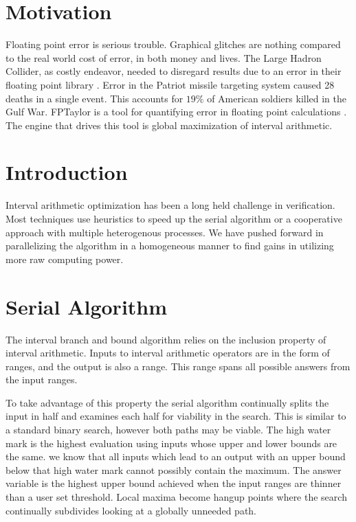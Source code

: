 \documentclass{acm_proc_article-sp}
\begin{document}
\maketitle

\section{Motivation}
Floating point error is serious trouble. Graphical glitches are nothing compared to the real world cost of error, in both money and lives. The Large Hadron Collider, as costly endeavor, needed to disregard results due to an error in their floating point library \cite{bailey2013high}. Error in the Patriot missile targeting system caused 28 deaths in a single event. This accounts for $19\%$ of American soldiers killed in the Gulf War\cite{blair1992patriot}. FPTaylor is a tool for quantifying error in floating point calculations \cite{fm2015-sjrg}. The engine that drives this tool is global maximization of interval arithmetic.

\section{Introduction}
Interval arithmetic optimization has been a long held challenge in verification. Most techniques use heuristics to speed up the serial algorithm or a cooperative approach with multiple heterogenous processes\cite{alliot2012finding}. We have pushed forward in parallelizing the algorithm in a homogeneous manner to find gains in utilizing more raw computing power.

\section{Serial Algorithm}
The interval branch and bound algorithm relies on the inclusion property of interval arithmetic. Inputs to interval arithmetic operators are in the form of ranges, and the output is also a range. This range spans all possible answers from the input ranges.

To take advantage of this property the serial algorithm continually splits the input in half and examines each half for viability in the search. This is similar to a standard binary search, however both paths may be viable. The high water mark is the highest evaluation using inputs whose upper and lower bounds are the same. we know that all inputs which lead to an output with an upper bound below that high water mark cannot possibly contain the maximum. The answer variable is the highest upper bound achieved when the input ranges are thinner than a user set threshold. Local maxima become hangup points where the search continually subdivides looking at a globally unneeded path.
\end{document}
